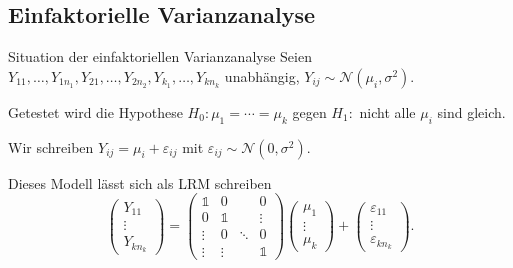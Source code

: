 \subsection{Einfaktorielle Varianzanalyse}

\begin{karte}{Situation der einfaktoriellen Varianzanalyse}
Seien \(Y_{11}, \ldots, Y_{1n_1}, Y_{21}, \ldots, Y_{2n_2}, Y_{k_1}, \ldots, Y_{k n_k}\) unabhängig, \(Y_{ij} \sim \mathcal{N}(\mu_i, \sigma^2)\).

Getestet wird die Hypothese \(H_0: \mu_1 = \cdots = \mu_k\) gegen \(H_1: \) nicht alle \(\mu_i\) sind gleich.

Wir schreiben \(Y_{ij} = \mu_i + \varepsilon_{ij}\) mit \(\varepsilon_{ij} \sim \mathcal{N}(0, \sigma^2)\).

Dieses Modell lässt sich als LRM schreiben 
\[ \begin{pmatrix}
    Y_{11} \\ \vdots \\ Y_{k n_k}
\end{pmatrix} = \begin{pmatrix}
    \mathds{1} & 0 & & 0 \\
    0 & \mathds{1} & & \vdots \\
    \vdots & 0 & \ddots & 0 \\
    \vdots & \vdots & & \mathds{1}
\end{pmatrix} \begin{pmatrix}
    \mu_1 \\ \vdots \\ \mu_k
\end{pmatrix} + \begin{pmatrix}
    \varepsilon_{11} \\ \vdots \\ \varepsilon_{k n_k}
\end{pmatrix}. \]
\end{karte}


